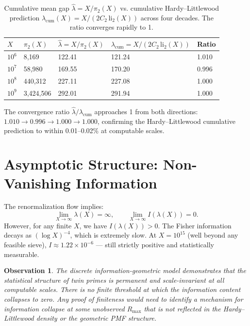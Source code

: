 \documentclass[11pt]{article}
\newtheorem{observation}{Observation}
\begin{document}
\begin{table}[h]
\centering
\caption{Cumulative mean gap $\hat{\lambda} = X/\pi_2(X)$ vs. cumulative Hardy--Littlewood prediction $\lambda_{\text{cum}}(X) = X/(2C_2\,\mathrm{li}_2(X))$ across four decades. The ratio converges rapidly to 1.}
\label{tab:scale-comparison}
\begin{tabular}{lllll}
\hline
$X$ & $\pi_2(X)$ & $\hat{\lambda} = X/\pi_2(X)$ & $\lambda_{\text{cum}} = X/(2C_2\,\mathrm{li}_2(X))$ & Ratio \\
\hline
$10^6$ & 8,169 & 122.41 & 121.24 & 1.010 \\
$10^7$ & 58,980 & 169.55 & 170.20 & 0.996 \\
$10^8$ & 440,312 & 227.11 & 227.08 & 1.000 \\
$10^9$ & 3,424,506 & 292.01 & 291.94 & 1.000 \\
\hline
\end{tabular}
\end{table}

\noindent The convergence ratio $\hat{\lambda}/\lambda_{\text{cum}}$ approaches 1 from both directions: $1.010 \to 0.996 \to 1.000 \to 1.000$, confirming the Hardy--Littlewood cumulative prediction to within 0.01--0.02\% at computable scales.

\section{Asymptotic Structure: Non-Vanishing Information}
The renormalization flow implies:
\begin{equation}
    \lim_{X \to \infty} \lambda(X) = \infty, \qquad
    \lim_{X \to \infty} I(\lambda(X)) = 0.
\end{equation}
However, for any finite $X$, we have $I(\lambda(X)) > 0$. The Fisher information decays as $(\log X)^{-4}$, which is extremely slow. At $X = 10^{15}$ (well beyond any feasible sieve), $I \approx 1.22 \times 10^{-6}$ --- still strictly positive and statistically measurable.

\begin{observation}
The discrete information-geometric model demonstrates that the statistical structure of twin primes is \textit{permanent and scale-invariant} at all computable scales. There is no finite threshold at which the information content collapses to zero. Any proof of finiteness would need to identify a mechanism for information collapse at some unobserved $R_{\max}$ that is not reflected in the Hardy--Littlewood density or the geometric PMF structure.
\end{observation}
\end{document}
